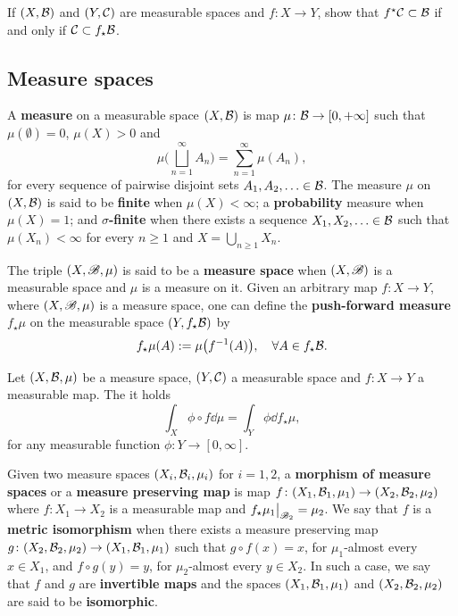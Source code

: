 \begin{exercise}
  If $(X,\mathcal{B})$ and $(Y,\mathcal{C})$ are measurable spaces and $f\colon X\to Y$, show that $f^{\star}\mathcal{C}\subset\mathcal{B}$ if and only if $\mathcal{C}\subset f_{\star}\mathcal{B}$.
\end{exercise}


\subsection{Measure spaces}
\label{sec:measure-spaces}

A \textbf{measure} on a measurable space $(X,\mathcal{B})$ is map $\mu\colon\mathcal{B}\to[0,+\infty]$ such that $\mu(\emptyset)=0$, $\mu(X)>0$ and
\begin{displaymath}
  \mu\bigg(\bigsqcup_{n=1}^{\infty} A_{n}\bigg) = \sum_{n=1}^{\infty} \mu(A_{n}),
\end{displaymath}
for every sequence of pairwise disjoint sets $A_{1},A_{2},\ldots \in\mathcal{B}$.
The measure $\mu$ on $(X,\mathcal{B})$ is said to be \textbf{finite} when $\mu(X)<\infty$; a \textbf{probability} measure when $\mu(X)=1$; and \textbf{$\sigma$-finite} when there exists a sequence $X_{1},X_{2},\ldots\in\mathcal{B}$ such that $\mu(X_{n})<\infty$ for every $n\geq 1$ and $X=\bigcup_{n\geq 1} X_{n}$.

The triple $(X,\mathscr{B},\mu)$ is said to be a \textbf{measure space} when $(X,\mathscr{B})$ is a measurable space and $\mu$ is a measure on it. Given an arbitrary map $f\colon X\to Y$, where $(X,\mathscr{B},\mu)$ is a measure space, one can define the \textbf{push-forward measure} $f_{\star}\mu$ on the measurable space $(Y,f_{\star}\mathcal{B})$ by
\begin{equation}
  \label{eq:push-forward-measure-def}
  f_{\star}\mu(A):=\mu\big(f^{-1}(A)\big), \quad\forall A\in f_{\star}\mathcal{B}.
\end{equation}
\begin{exercise}\label{exer:pull-back-function-push-forward-measures}
  Let $(X,\mathcal{B},\mu)$ be a measure space, $(Y,\mathcal{C})$ a measurable space and $f\colon X\to Y$ a measurable map. The it holds
  \begin{displaymath}
    \int_{X}\phi\circ f\dd\mu = \int_{Y}\phi\dd f_{\star}\mu,
  \end{displaymath}
  for any measurable function $\phi\colon Y\to [0,\infty]$.
\end{exercise}

Given two measure spaces $(X_i,\mathcal{B}_i,\mu_i)$ for $i=1,2$, a \textbf{morphism of measure spaces} or a \textbf{measure preserving map} is map $f\colon (X_1,\mathcal{B}_1,\mu_1)\to (X_2,\mathcal{B}_2,\mu_2)$ where $f\colon X_1\to X_2$ is a measurable map and $f_{\star}\mu_1\big|_{\mathscr{B}_2}=\mu_2$. We say that $f$ is a \textbf{metric isomorphism} when there exists a measure preserving map $g\colon (X_2,\mathcal{B}_2,\mu_2)\to (X_1,\mathcal{B}_1,\mu_1)$ such that $g\circ f(x)=x$, for $\mu_1$-almost every $x\in X_1$, and $f\circ g(y)=y$, for $\mu_2$-almost every $y\in X_2$. In such a case, we say that $f$ and $g$ are \textbf{invertible maps} and the spaces $(X_1,\mathcal{B}_1,\mu_1)$ and $(X_2,\mathcal{B}_2,\mu_2)$ are said to be \textbf{isomorphic}.


